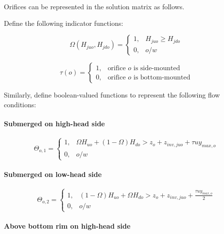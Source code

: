 \documentclass[11pt]{article}
\begin{document}
Orifices can be represented in the solution matrix as follows.

Define the following indicator functions:

\begin{equation}
  \Omega(H_{juo}, H_{jdo}) = 
  \begin{cases}
    1, & H_{juo} \geq H_{jdo} \\
    0, & o/w
  \end{cases}
\end{equation}

\begin{equation}
  \tau(o) = 
  \begin{cases}
    1, & \text{orifice $o$ is side-mounted} \\
    0, & \text{orifice $o$ is bottom-mounted}
  \end{cases}
\end{equation}

Similarly, define boolean-valued functions to represent the
following flow conditions:

\paragraph{Submerged on high-head side}

\begin{equation}
  \Theta_{o,1} =
  \begin{cases}
    1, &   \Omega H_{uo} + (1 - \Omega) H_{do} > z_o + z_{inv,juo} + \tau u y_{max,o} \\
    0, & o/w
  \end{cases}
\end{equation}

\paragraph{Submerged on low-head side}

\begin{equation}
  \Theta_{o,2} =
  \begin{cases}
    1, & (1 - \Omega) H_{uo} + \Omega H_{do} > z_o + z_{inv,juo} + \frac{\tau u y_{max,o}}{2} \\
    0, & o/w
  \end{cases}
\end{equation}

\paragraph{Above bottom rim on high-head side}
\end{document}
